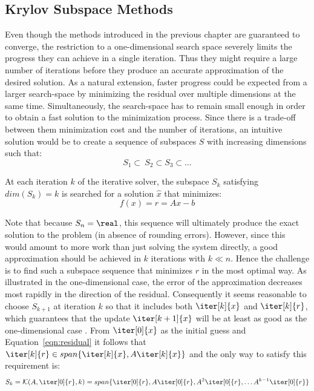 \subsection{Krylov Subspace Methods}
\label{sec:krylov_methods}

Even though the methods introduced in the previous chapter are guaranteed to converge, the restriction to a one-dimensional search space severely limits the progress they can achieve in a single iteration. Thus they might require a large number of iterations before they produce an accurate approximation of the desired solution. As a natural extension, faster progress could be expected from a larger search-space by minimizing the residual over multiple dimensions at the same time. Simultaneously, the search-space has to remain small enough in order to obtain a fast solution to the minimization process. Since there is a trade-off between them minimization cost and the number of iterations, an intuitive solution would be to create a sequence of subspaces $S$ with increasing dimensions such that:
\begin{equation}
    S_1 \subset \ S_2 \subset S_3 \subset \dots
\end{equation}

\noindent At each iteration $k$ of the iterative solver, the subspace $S_k$ satisfying $dim(S_k)=k$ is searched for a solution $\hat{x}$ that minimizes:
\begin{equation}
\label{eqn:residual}
    f(x)= r = Ax-b
\end{equation}

\noindent Note that because $S_n=\real$, this sequence will ultimately produce the exact solution to the problem (in absence of rounding errors). However, since this would amount to more work than just solving the system directly, a good approximation should be achieved in $k$ iterations with $k \ll n$. Hence the challenge is to find such a subspace sequence that minimizes $r$ in the most optimal way. As illustrated in the one-dimensional case, the error of the approximation decreases most rapidly in the direction of the residual. Consequently it seems reasonable to choose $S_{k+1}$ at iteration $k$ so that it includes both $\iter[k]{x}$ and $\iter[k]{r}$, which guarantees that the update $\iter[k+1]{x}$ will be at least as good as the one-dimensional case \cite{golub_matrix_2013}. From $\iter[0]{x}$ as the initial guess and Equation~\hyperref[eqn:residual]{\ref{eqn:residual}} it follows that $\iter[k]{r} \in span\{\iter[k]{x},A\iter[k]{x}\}$ and the only way to satisfy this requirement is:
\begin{equation}
    S_k=\mathcal{K}(A,\iter[0]{r}, k) = span\{\iter[0]{r}, A\iter[0]{r}, A^2\iter[0]{r},\dots A^{k-1}\iter[0]{r}\}
\end{equation}

